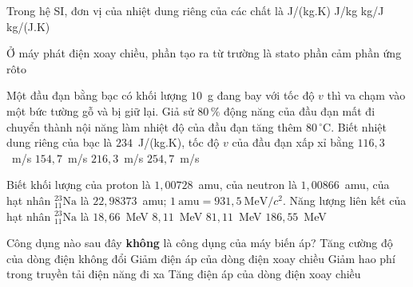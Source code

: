 	\begin{ex}%
		Trong hệ SI, đơn vị của nhiệt dung riêng của các chất là
		\choice
		{\True J/(kg.K)}
		{J/kg}
		{kg/J}
		{kg/(J.K)}
	\end{ex}

	\begin{ex}%
		Ở máy phát điện xoay chiều, phần tạo ra từ trường là
		\choice
		{stato}
		{\True phần cảm}
		{phần ứng}
		{rôto}
	\end{ex}

	\begin{ex}%
		Một đầu đạn bằng bạc có khối lượng $10$~g đang bay với tốc độ $v$ thì va chạm vào một bức tường gỗ và bị giữ lại. Giả sử $80\,\%$ động năng của đầu đạn mất đi chuyển thành nội năng làm nhiệt độ của đầu đạn tăng thêm $80\,^\circ\text{C}$. Biết nhiệt dung riêng của bạc là $234$~J/(kg.K), tốc độ $v$ của đầu đạn xấp xỉ bằng
		\choice
		{$116{,}3$~m/s}
		{$154{,}7$~m/s}
		{\True $216{,}3$~m/s}
		{$254{,}7$~m/s}
	\end{ex}

	\begin{ex}%
		Biết khối lượng của proton là $1{,}00728$~amu, của neutron là $1{,}00866$~amu, của hạt nhân ${}^{23}_{11}\text{Na}$ là $22{,}98373$~amu; $1~\text{amu}=931{,}5~\text{MeV}/c^2$. Năng lượng liên kết của hạt nhân ${}^{23}_{11}\text{Na}$ là
		\choice
		{$18{,}66$~MeV}
		{$8{,}11$~MeV}
		{$81{,}11$~MeV}
		{\True $186{,}55$~MeV}
	\end{ex}

	\begin{ex}%
		Công dụng nào sau đây \textbf{không} là công dụng của máy biến áp?
		\choice
		{\True Tăng cường độ của dòng điện không đổi}
		{Giảm điện áp của dòng điện xoay chiều}
		{Giảm hao phí trong truyền tải điện năng đi xa}
		{Tăng điện áp của dòng điện xoay chiều}
	\end{ex}

